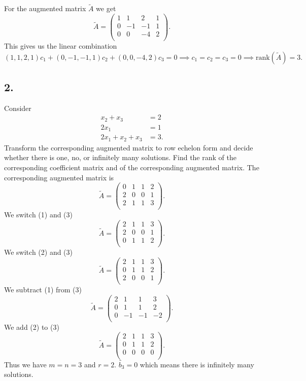 For the augmented matrix $\tilde{A}$ we get
\[ 
\tilde{A} = \left( \begin{array}{ccc|c}
1 & 1 & 2 & 1\\
0 & -1 & -1 & 1\\
0 & 0 & -4 & 2\\
\end{array} \right)
.\]
This gives us the linear combination
\[ 
  (1,1,2,1)c_1 + (0,-1,-1,1)c_2 + (0,0,-4,2)c_3 = 0 \implies c_1 = c_2 = c_3 = 0 \implies \mathrm{rank}(\tilde{A}) = 3
.\]



\subsection*{2.}
Consider
\begin{align*}
  x_2 + x_3 &= 2 \\
  2x_1 &= 1 \\
  2x_1 + x_2 + x_3 &= 3
.\end{align*}
Transform the corresponding augmented matrix to row echelon form and decide whether there is one, no, or infinitely many solutions. Find the rank of the corresponding coefficient matrix and of the corresponding augmented matrix.
\bigbreak
The corresponding augmented matrix is
\[ 
\tilde{A} = \left( \begin{array}{ccc|c}
0 & 1 & 1 & 2\\
2 & 0 & 0 & 1\\
2 & 1 & 1 & 3\\
\end{array} \right)
.\]
We switch (1) and (3)
\[ 
\tilde{A} = \left( \begin{array}{ccc|c}
2 & 1 & 1 & 3\\
2 & 0 & 0 & 1\\
0 & 1 & 1 & 2\\
\end{array} \right)
.\]
We switch (2) and (3)
\[ 
\tilde{A} = \left( \begin{array}{ccc|c}
2 & 1 & 1 & 3\\
0 & 1 & 1 & 2\\
2 & 0 & 0 & 1\\
\end{array} \right)
.\]
We subtract (1) from (3)
\[ 
\tilde{A} = \left( \begin{array}{ccc|c}
2 & 1 & 1 & 3\\
0 & 1 & 1 & 2\\
0 & -1 & -1 & -2\\
\end{array} \right)
.\]
We add (2) to (3)
\[ 
  \tilde{A} = \left( \begin{array}{ccc|c}
2 & 1 & 1 & 3\\
0 & 1 & 1 & 2\\
0 & 0 & 0 & 0\\
\end{array} \right)
.\]
Thus we have $m = n = 3$ and $r = 2$. $\tilde{b_3} = 0$ which means there is infinitely many solutions.


